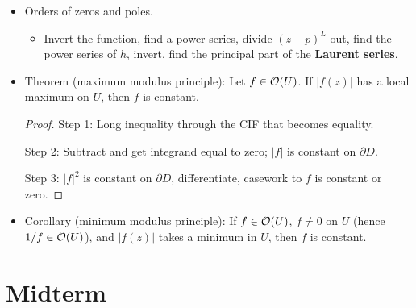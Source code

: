 \documentclass[../notes.tex]{subfiles}
\begin{document}
\begin{itemize}
    \item Orders of zeros and poles.
    \begin{itemize}
        \item Invert the function, find a power series, divide $(z-p)^L$ out, find the power series of $h$, invert, find the principal part of the \textbf{Laurent series}.
    \end{itemize}
    \item Theorem (maximum modulus principle): Let $f\in\mathcal{O}(U)$. If $|f(z)|$ has a local maximum on $U$, then $f$ is constant.
    \begin{proof}
        Step 1: Long inequality through the CIF that becomes equality.\par
        Step 2: Subtract and get integrand equal to zero; $|f|$ is constant on $\partial D$.\par
        Step 3: $|f|^2$ is constant on $\partial D$, differentiate, casework to $f$ is constant or zero.
    \end{proof}
    \item Corollary (minimum modulus principle): If $f\in\mathcal{O}(U)$, $f\neq 0$ on $U$ (hence $1/f\in\mathcal{O}(U)$), and $|f(z)|$ takes a minimum in $U$, then $f$ is constant.
\end{itemize}



\section{Midterm}
\end{document}
